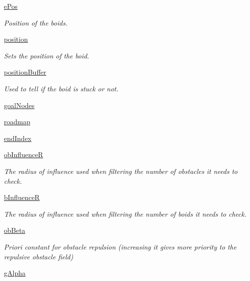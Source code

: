 \begin{DoxyCompactItemize}
\hyperlink{classboid_1_1Boid_a15b3d73058c73aed19d2e9fb0266805d}{e\-Pos}
\begin{DoxyCompactList}\small\item\em Position of the boids. \end{DoxyCompactList}\item 
\hyperlink{classboid_1_1Boid_a483cb30093bc500a6123d5a801247ad5}{position}
\begin{DoxyCompactList}\small\item\em Sets the position of the boid. \end{DoxyCompactList}\item 
\hyperlink{classboid_1_1Boid_ab6c778a50dd384fabc6aa48be04c0988}{position\-Buffer}
\begin{DoxyCompactList}\small\item\em Used to tell if the boid is stuck or not. \end{DoxyCompactList}\item 
\hyperlink{classboid_1_1Boid_a8d7aa6d57eb3589a0770af8fcbf1aa0b}{goal\-Nodes}
\item 
\hyperlink{classboid_1_1Boid_aa30539a3bd11871eda471245cd6318e2}{roadmap}
\item 
\hyperlink{classboid_1_1Boid_ae0e9562ea35dca5f6d88e132cb5dd73a}{end\-Index}
\item 
\hyperlink{classboid_1_1Boid_abc5327f9ad46170e5f57d89c2c6e18e9}{ob\-Influence\-R}
\begin{DoxyCompactList}\small\item\em The radius of influence used when filtering the number of obstacles it needs to check. \end{DoxyCompactList}\item 
\hyperlink{classboid_1_1Boid_ae1a1d62fdc0e9014df5fcb1a49d37342}{b\-Influence\-R}
\begin{DoxyCompactList}\small\item\em The radius of influence used when filtering the number of boids it needs to check. \end{DoxyCompactList}\item 
\hyperlink{classboid_1_1Boid_a222ad56335a1e1ea39dd6da9e21797c5}{ob\-Beta}
\begin{DoxyCompactList}\small\item\em Priori constant for obstacle repulsion (increasing it gives more priority to the repulsive obstacle field) \end{DoxyCompactList}\item 
\hyperlink{classboid_1_1Boid_a5090639a7e3a489c8dc83bd12b6d1653}{g\-Alpha}

\end{DoxyCompactItemize}
